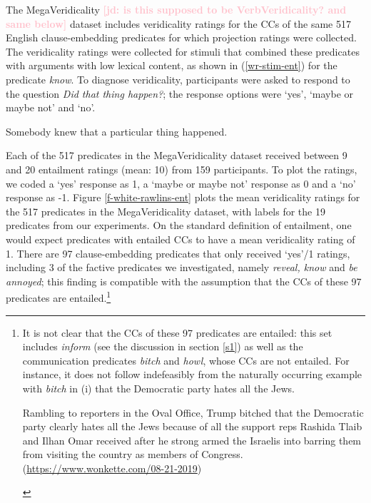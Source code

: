 \documentclass[11pt,fleqn]{article}
\newcommand{\jd}[1]{\textbf{\textcolor{Pink}{[jd: #1]}}}
\newcommand{\6}{\mbox{$[\hspace*{-.6mm}[$}}
\newcommand{\9}{\mbox{$]\hspace*{-.6mm}]$}}
\begin{document}
The MegaVeridicality \jd{is this supposed to be VerbVeridicality? and same below} dataset includes veridicality ratings for the CCs of the same 517 English clause-embedding predicates for which projection ratings were collected. The veridicality ratings were collected for stimuli that combined these predicates with arguments with low lexical content, as shown in (\ref{wr-stim-ent}) for the predicate {\em know}. To diagnose veridicality, participants were asked to respond to the question {\em Did that thing happen?}; the response options were `yes', `maybe or maybe not' and `no'. 

\begin{exe}
\ex\label{wr-stim-ent} Somebody knew that a particular thing happened.
\end{exe}

Each of the 517 predicates in the MegaVeridicality dataset received between 9 and 20 entailment ratings (mean: 10) from 159 participants. To plot the ratings, we coded a `yes' response as 1, a `maybe or maybe not' response as 0 and a `no' response as -1. Figure \ref{f-white-rawlins-ent} plots the mean veridicality ratings for the 517 predicates in the MegaVeridicality dataset, with labels for the 19 predicates from our experiments. On the standard definition of entailment, one would expect predicates with entailed CCs to have a mean veridicality rating of 1. There are 97 clause-embedding predicates that only received `yes'/1 ratings, including 3 of the factive predicates we investigated, namely {\em reveal, know} and {\em be annoyed}; this finding is compatible with the assumption that the CCs of these 97 predicates are entailed.\footnote{\label{mv}It is not clear that the CCs of these 97 predicates are entailed: this set includes {\em inform} (see the discussion in section \ref{s1}) as well as the communication predicates {\em bitch} and {\em howl}, whose CCs are not entailed. 
For instance, it does not follow indefeasibly from the naturally occurring example with {\em bitch} in (i) that the Democratic party hates all the Jews.
\begin{exe}
 Rambling to reporters in the Oval Office, Trump bitched that the Democratic party clearly hates all the Jews because of all the support reps Rashida Tlaib and Ilhan Omar received after he strong armed the Israelis into barring them from visiting the country as members of Congress. (\url{https://www.wonkette.com/08-21-2019})
\end{exe}
}
\end{document}
